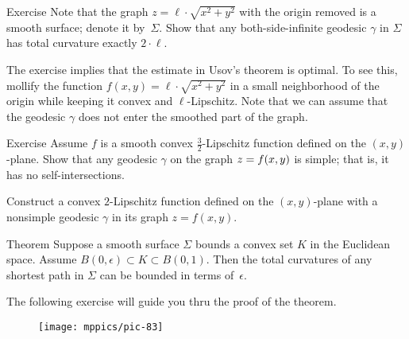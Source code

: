 \begin{thm}{Exercise}\label{ex:usov-exact}
Note that the graph $z=\ell\cdot\sqrt{x^2+y^2}$ with the origin removed is a smooth surface; denote it by~$\Sigma$.
Show that any both-side-infinite geodesic $\gamma$ in $\Sigma$ has total curvature exactly $2\cdot \ell$.
\end{thm}

The exercise implies that the estimate in Usov's theorem is optimal.
To see this, mollify the function $f(x,y)=\ell\cdot\sqrt{x^2+y^2}$ in a small neighborhood of the origin while keeping it convex and $\ell$-Lipschitz. 
Note that we can assume that the geodesic $\gamma$ does not enter the smoothed part of the graph.


\begin{thm}{Exercise}\label{ex:ruf-bound-mountain}
Assume $f$ is a smooth convex $\tfrac32$-Lipschitz function defined on the $(x,y)$-plane.
Show that any geodesic $\gamma$ on the graph $z\z=f(x,y)$ is simple;
that is, it has no self-intersections.

Construct a convex $2$-Lipschitz function defined on the $(x,y)$-plane
with a nonsimple geodesic $\gamma$ in its graph $z=f(x,y)$.
\end{thm}


\begin{thm}{Theorem}\label{thm:tc-of-mingeod}
Suppose a smooth surface $\Sigma$ bounds a convex set $K$ in the Euclidean space.
Assume $B(0,\epsilon)\subset K\subset B(0,1)$.
Then the total curvatures of any shortest path in $\Sigma$ can be bounded in terms of~$\epsilon$. 
\end{thm}

The following exercise will guide you thru the proof of the theorem. 

\begin{wrapfigure}{r}{48 mm}
\vskip-2mm
\centering
\texttt{[image: mppics/pic-83]}
\vskip-0mm
\end{wrapfigure}


